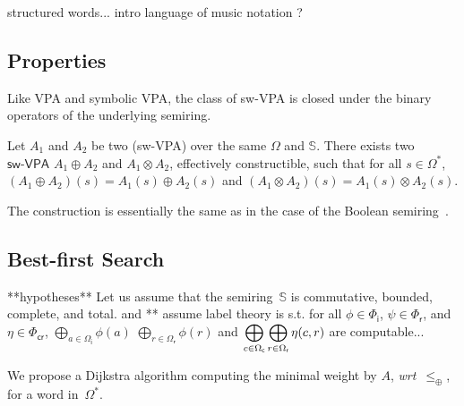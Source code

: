 \documentclass[runningheads]{llncs}
\def\wrt{\textit{wrt}\xspace}
\newcommand{\Semiring}{\mathbb{S}}
\def\SWVPA{\textsf{sw-VPA}\xspace}
\newcommand{\call}[1]{\ensuremath #1} %
\newcommand{\return}[1]{\ensuremath #1} %
\def\Omegai{{\Omega_\mathsf{i}}}
\def\Omegac{{\Omega_\mathsf{c}}}
\def\Omegar{{\Omega_\mathsf{r}}}
\def\Phii{{\Phi_\mathsf{i}}}
\def\Phir{{\Phi_\mathsf{r}}}
\def\Phicr{{\Phi_\mathsf{cr}}}
\begin{document}
\begin{example}
structured words...
intro language of music notation ?
\end{example}


\subsection{Properties}
Like VPA and symbolic VPA, 
the class of \SWVPA is closed under the binary operators of the underlying semiring.
%
\begin{proposition}
Let $A_1$ and $A_2$ be two (\SWVPA)
over the same $\Omega$ and $\Semiring$.
There exists two $\SWVPA$ $A_1 \oplus A_2$ and $A_1 \otimes A_2$, 
effectively constructible, 
such that for all $s \in \Omega^*$, 
$(A_1 \oplus A_2)(s) = A_1(s) \oplus A_2(s)$ and 
$(A_1 \otimes A_2)(s) = A_1(s) \otimes A_2(s)$.
\end{proposition}
The construction is essentially the same 
as in the case of the Boolean semiring~\cite{dAntonyAlur14SVPDA}.


\subsection{Best-first Search} 
\label{sec:best}\label{sec:search}
**hypotheses**
Let us assume that the semiring~$\Semiring$ is
commutative, bounded, complete, and total.
and 
** assume label theory is s.t. 
for all $\phi \in \Phii$, 
$\psi \in \Phir$, 
and $\eta \in \Phicr$, 
$\displaystyle\bigoplus_{a \in \Omegai} \phi(a)$ 
$\displaystyle\bigoplus_{r \in \Omegar} \phi(r)$ and 
$\displaystyle\bigoplus_{{\call{c}} \in \Omegac} 
\displaystyle\bigoplus_{{\return{r}} \in \Omegar} \eta({\call{c}}, {\return{r}})$
are computable...


We propose a Dijkstra algorithm computing the minimal weight by $A$, 
\wrt~$\leq_\oplus$, for a word in~$\Omega^*$.
\end{document}
